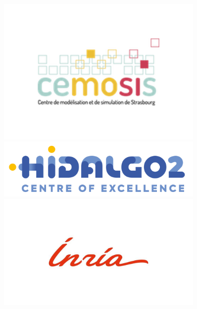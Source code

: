 \documentclass{beamer}
\begin{document}
\begin{frame}
\begin{figure}
        \begin{minipage}{0.33\textwidth}
            \centering
            \includegraphics[width=0.9\textwidth]{../image/logoCemosis-square-e1469167314407.png}
        \end{minipage}%
        \begin{minipage}{0.33\textwidth}
            \centering
            \includegraphics[width=0.9\textwidth]{../image/HiDALGO2 - logo - color - RGB.jpg}
        \end{minipage}%
        \begin{minipage}{0.33\textwidth}
            \centering
            \includegraphics[width=0.9\textwidth]{../image/G_logo-inria-rouge-reduce_inr_logo_rouge_1080x608.jpg}
        \end{minipage}
        
    \end{figure}
    \end{frame}

\begin{frame}
    \tableofcontents
\end{frame}
\end{document}
